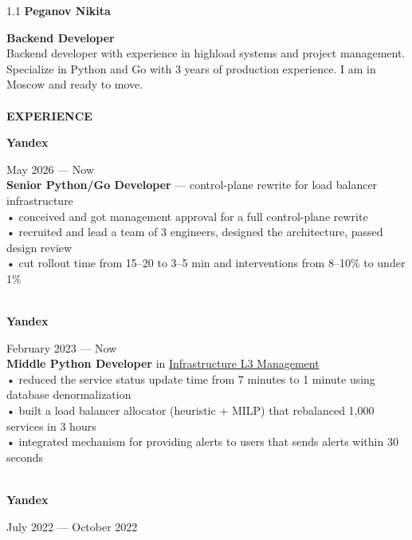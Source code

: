 \documentclass{article}
\begin{document}
\begin{vwcol}[widths={0.8,0.2},
 sep=.8cm, justify=flush,rule=0pt,indent=1em] 
\begin{spacing}{1.1}
\noindent\textbf{\Huge{Peganov Nikita}}\\
\end{spacing}
\noindent\textcolor[rgb]{0.1255,0.2902,0.7843}{\textbf{\Large{Backend Developer}}}\\
Backend developer with experience in highload systems and project management. Specialize in Python and Go with 3 years of production experience. I am in Moscow and ready to move.\\
\\
\noindent\textcolor[rgb]{0.1255,0.2902,0.7843}{\textbf{\Large{EXPERIENCE}}}\\
\begin{Large}
\textbf{Yandex}
\end{Large}
\hspace{282pt}May 2026 — Now\\
\textbf{Senior Python/Go Developer} — control-plane rewrite for load balancer infrastructure\\
• conceived and got management approval for a full control-plane rewrite\\
• recruited and lead a team of 3 engineers, designed the architecture, passed design review\\
• cut rollout time from 15–20 to 3–5 min and interventions from 8–10\% to under 1\%\\
\\
\begin{Large}
\textbf{Yandex}
\end{Large}
\hspace{272pt}February 2023 — Now\\
\textbf{Middle Python Developer} in \href{https://infraevents.yandex.ru/}{Infrastructure L3 Management}\\
• reduced the service status update time from 7 minutes to 1 minute using database denormalization\\
• built a load balancer allocator (heuristic + MILP) that rebalanced 1{,}000 services in 3 hours\\
• integrated mechanism for providing alerts to users that sends alerts within 30 seconds\\
\\
\begin{Large}
\textbf{Yandex}
\end{Large}
\hspace{257pt}July 2022 — October 2022\\

\end{vwcol}
\end{document}

